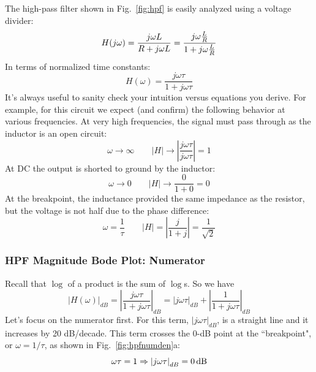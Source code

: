 The high-pass filter shown in Fig.~\ref{fig:hpf}  is easily analyzed using a voltage divider:
 \begin{equation}
H(j\omega ) = \frac{{j\omega L}}{{R + j\omega L}} = \frac{{j\omega \frac{L}{R}}}{{1 + j\omega \frac{L}{R}}}\\
  \end{equation}
In terms of normalized time constants:  
\begin{equation}
  H(\omega ) = \frac{{j\omega \tau }}{{1 + j\omega \tau }}
\end{equation}
It's always useful to sanity check your intuition versus equations you derive.  For example, for this circuit we expect (and confirm) the following behavior at various frequencies.  At very high frequencies, the signal must pass through as the inductor is an open circuit:
\begin{equation}
\omega  \to \infty  \quad\quad  \left| H \right| \to \left| {\frac{{j\omega \tau }}{{j\omega \tau }}} \right| = 1
\end{equation}
At DC the output is shorted to ground by the inductor:
\begin{equation}
\omega  \to 0  \quad\quad \left| H \right| \to \frac{0}{{1 + 0}} = 0
\end{equation}
At the breakpoint, the inductance provided the same impedance as the resistor, but the voltage is not half due to the phase difference:
\begin{equation}
\omega  = \frac{1}{\tau }  \quad\quad  \left| H \right| = \left| {\frac{j}{{1 + j}}} \right| = \frac{1}{{\sqrt 2 }}
\end{equation}



\subsubsection{HPF Magnitude Bode Plot: Numerator}

Recall that $\log$ of a product is the sum of $\log$s.  So we have
%
\begin{equation}
{\left| {H(\omega )} \right|_{dB}} = {\left| {\frac{{j\omega \tau }}{{1 + j\omega \tau }}} \right|_{dB}} = {\left| {j\omega \tau } \right|_{dB}} + {\left| {\frac{1}{{1 + j\omega \tau }}} \right|_{dB}}
\end{equation}
%
Let's focus on the numerator first.  For this term, $\left|j\omega \tau  \right|_{dB} $, is a straight line and it increases by 20 dB/decade.  This term crosses the 0-dB point at the ``breakpoint", or $\omega = 1/\tau$, as shown in Fig.~\ref{fig:hpfnumden}a:
\begin{equation}
\omega \tau  = 1 \Rightarrow {\left| {j\omega \tau } \right|_{dB}} = 0\,{\rm{dB}}
\end{equation}


